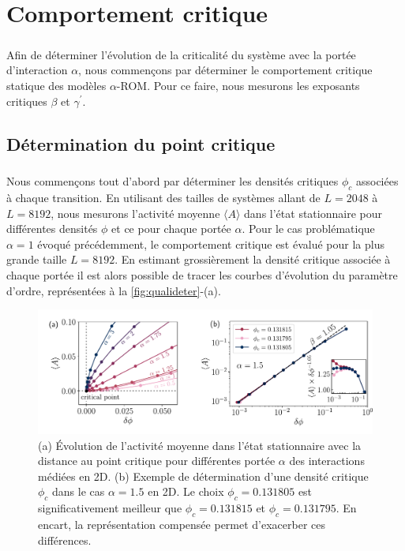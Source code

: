 \section{Comportement critique}

\subparagraph{}Afin de déterminer l'évolution de la criticalité du système avec la portée d'interaction $\alpha$, nous commençons par déterminer le comportement critique statique des modèles $\alpha$-ROM. Pour ce faire, nous mesurons les exposants critiques $\beta$ et $\gamma^\prime$.

\subsection{Détermination du point critique}

\subparagraph{}Nous commençons tout d'abord par déterminer les densités critiques $\phi_c$ associées à chaque transition. En utilisant des tailles de systèmes allant de $L=2048$ à $L=8192$, nous mesurons l'activité moyenne $\langle A \rangle$ dans l'état stationnaire pour différentes densités $\phi$ et ce pour chaque portée $\alpha$. Pour le cas problématique $\alpha=1$ évoqué précédemment, le comportement critique est évalué pour la plus grande taille $L=8192$. En estimant grossièrement la densité critique associée à chaque portée il est alors possible de tracer les courbes d'évolution du paramètre d'ordre, représentées à la \autoref{fig:qualideter}-(a).

\begin{figure}[h]
	\centering	\includegraphics[width=\textwidth]{Chapitre3/Figures/BetaGamma/EvolMeanDeter.pdf}
	\caption{(a) Évolution de l'activité moyenne dans l'état stationnaire avec la distance au point critique pour différentes portée $\alpha$ des interactions médiées en 2D. (b) Exemple de détermination d'une densité critique $\phi_c$ dans le cas $\alpha = 1.5$ en 2D. Le choix $\phi_c = 0.131805$ est significativement meilleur que $\phi_c = 0.131815$ et $\phi_c = 0.131795$. En encart, la représentation compensée permet d'exacerber ces différences.}
	\label{fig:qualideter}
\end{figure}

